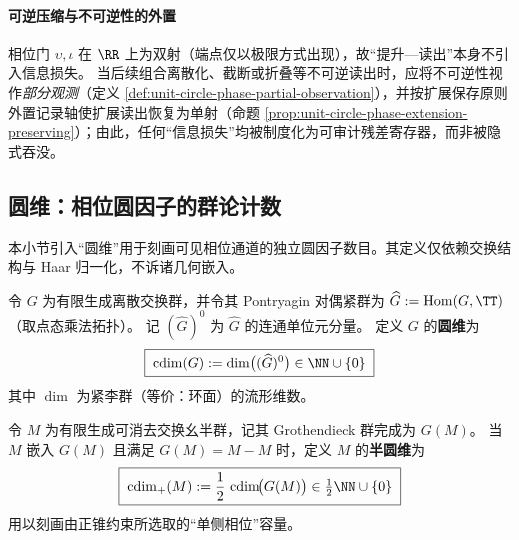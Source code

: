 \paragraph{可逆压缩与不可逆性的外置}
相位门 \(\upsilon,\iota\) 在 \(\RR\) 上为双射（端点仅以极限方式出现），故“提升—读出”本身不引入信息损失。
当后续组合离散化、截断或折叠等不可逆读出时，应将不可逆性视作\emph{部分观测}（定义 \ref{def:unit-circle-phase-partial-observation}），并按扩展保存原则外置记录轴使扩展读出恢复为单射（命题 \ref{prop:unit-circle-phase-extension-preserving}）；由此，任何“信息损失”均被制度化为可审计残差寄存器，而非被隐式吞没。


\subsection{圆维：相位圆因子的群论计数}\label{subsec:cdim-circle-dimension}
本小节引入“圆维”用于刻画可见相位通道的独立圆因子数目。其定义仅依赖交换结构与 Haar 归一化，不诉诸几何嵌入。

\begin{definition}[圆维]\label{def:circle-dimension}
令 \(G\) 为有限生成离散交换群，并令其 Pontryagin 对偶紧群为 \(\widehat{G}:=\operatorname{Hom}(G,\TT)\)（取点态乘法拓扑）。
记 \((\widehat G)^0\) 为 \(\widehat G\) 的连通单位元分量。
定义 \(G\) 的\textbf{圆维}为
\[
\boxed{\;\cdim(G):=\dim\bigl((\widehat G)^0\bigr)\in\NN\cup\{0\}\;}
\]
其中 \(\dim\) 为紧李群（等价：环面）的流形维数。
\end{definition}

\begin{definition}[半圆维]\label{def:half-circle-dimension}
令 \(M\) 为有限生成可消去交换幺半群，记其 Grothendieck 群完成为 \(G(M)\)。
当 \(M\) 嵌入 \(G(M)\) 且满足 \(G(M)=M-M\) 时，定义 \(M\) 的\textbf{半圆维}为
\[
\boxed{\;\cdim_{+}(M):=\frac12\,\cdim\!\bigl(G(M)\bigr)\in\tfrac12\NN\cup\{0\}\;}
\]
用以刻画由正锥约束所选取的“单侧相位”容量。
\end{definition}


